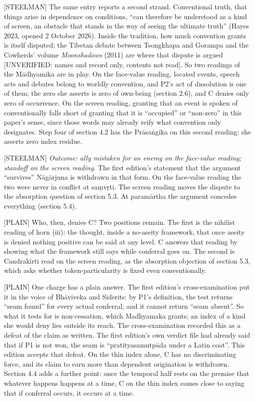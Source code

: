 \documentclass[11pt]{article}
\newcommand{\register}[1]{{\ttfamily\small #1}}
\begin{document}
\register{[STEELMAN]} The same entry reports a second strand. Conventional truth, that things arise in dependence on conditions, ``can therefore be understood as a kind of screen, an obstacle that stands in the way of seeing the ultimate truth'' (Hayes 2023, opened 2 October 2026). Inside the tradition, how much convention grants is itself disputed; the Tibetan debate between Tsongkhapa and Gorampa and the Cowherds' volume \emph{Moonshadows} (2011) are where that dispute is argued [UNVERIFIED: names and record only, contents not read]. So two readings of the Mādhyamika are in play. On the face-value reading, located events, speech acts and debates belong to worldly convention, and P2's act of dissolution is one of them; the zero she asserts is zero of own-being (section 2.6), and C denies only zero of occurrence. On the screen reading, granting that an event is spoken of conventionally falls short of granting that it is ``occupied'' or ``non-zero'' in this paper's sense, since those words may already reify what convention only designates. Step four of section 4.2 has the Prāsaṅgika on this second reading: she asserts zero index residue.

\register{[STEELMAN]} \emph{Outcome: ally mistaken for an enemy on the face-value reading; standoff on the screen reading.} The first edition's statement that the argument ``survives'' Nāgārjuna is withdrawn in that form. On the face-value reading the two were never in conflict at saṃvṛti. The screen reading moves the dispute to the absorption question of section 5.3. At paramārtha the argument concedes everything (section 5.4).

\register{[PLAIN]} Who, then, denies C? Two positions remain. The first is the nihilist reading of horn (iii): the thought, inside a no-aseity framework, that once aseity is denied nothing positive can be said at any level. C answers that reading by showing what the framework still says while conferral goes on. The second is Candrakīrti read on the screen reading, as the absorption objection of section 5.3, which asks whether token-particularity is fixed even conventionally.

\register{[PLAIN]} One charge has a plain answer. The first edition's cross-examination put it in the voice of Bhāviveka and Siderits: by P1's definition, the test returns ``seam found'' for every actual conferral, and it cannot return ``seam absent''. So what it tests for is non-cessation, which Madhyamaka grants; an index of a kind she would deny lies outside its reach. The cross-examination recorded this as a defeat of the claim as written. The first edition's own verdict file had already said that if P1 is not won, the seam is ``pratītyasamutpāda under a Latin coat''. This edition accepts that defeat. On the thin index alone, C has no discriminating force, and its claim to earn more than dependent origination is withdrawn. Section 4.4 adds a further point: once the temporal half rests on the premise that whatever happens happens at a time, C on the thin index comes close to saying that if conferral occurs, it occurs at a time.
\end{document}
